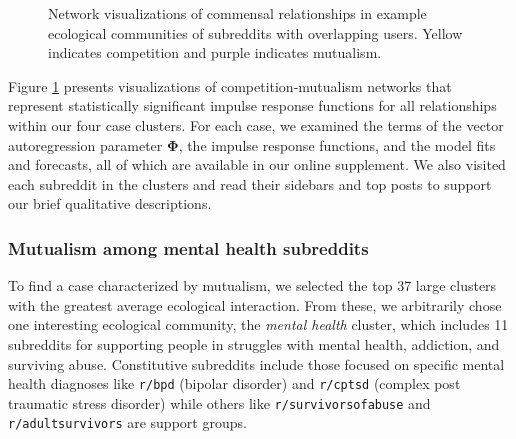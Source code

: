 \documentclass[letterpaper]{article}\usepackage[]{graphicx}\usepackage[]{color}
\def\Slash{\slash\hspace{0pt}}
\begin{document}
\begin{figure}
\begin{minipage}[t][][t]{\columnwidth}
\end{minipage}
\caption{Network visualizations of commensal relationships in example ecological communities of subreddits with overlapping users. Yellow indicates competition and purple indicates mutualism. \label{fig:networks}}
\end{figure}

Figure \ref{fig:networks} presents visualizations of competition-mutualism networks that represent statistically significant impulse response functions for all relationships within our four case clusters. For each case, we examined the terms of the vector autoregression parameter $\mathbf{\Phi}$, the impulse response functions, and the model fits and forecasts, all of which are available in our online supplement.  We also visited each subreddit in the clusters and read their sidebars and top posts to support our brief qualitative descriptions.

\subsubsection{Mutualism among mental health subreddits}

To find a case characterized by mutualism, we selected the top 37 large clusters with the greatest average ecological interaction. From these, we arbitrarily chose one interesting ecological community, the \textit{mental health} cluster, which includes 11 subreddits for supporting people in struggles with mental health, addiction, and surviving abuse.  
Constitutive subreddits include those focused on specific mental health diagnoses like \texttt{r\Slash bpd} (bipolar disorder) and \texttt{r\Slash cptsd} (complex post traumatic stress disorder) while others like \texttt{r\Slash survivorsofabuse} and \texttt{r\Slash adultsurvivors}
are support groups. 
\end{document}
